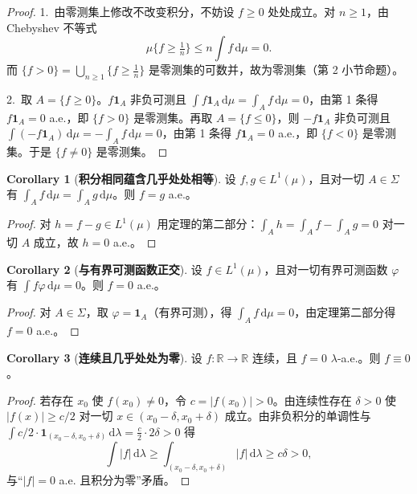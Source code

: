 \documentclass[oneside]{book}
\theoremstyle{definition}
\newcommand{\R}{\mathbb{R}}
\newcommand{\dd}{\mathrm{d}}
\theoremstyle{definition}
\newtheorem{corollary}{Corollary}[section]
\begin{document}
	\begin{proof}
		1.\ 由零测集上修改不改变积分，不妨设 $f\geqslant0$ 处处成立。对 $n\geqslant1$，由 Chebyshev 不等式
		\[
		\mu\{f\geqslant\tfrac1n\}\leqslant n\int f\,\dd\mu=0 .
		\]
		而 $\{f>0\}=\bigcup_{n\geqslant1}\{f\geqslant\tfrac1n\}$ 是零测集的可数并，故为零测集（第 2 小节命题）。
		
		2.\ 取 $A=\{f\geqslant0\}$。$f\mathbf{1}_A$ 非负可测且 $\int f\mathbf{1}_A\,\dd\mu=\int_A f\,\dd\mu=0$，由第 1 条得 $f\mathbf{1}_A=0$ a.e.，即 $\{f>0\}$ 是零测集。再取 $A=\{f\leqslant0\}$，则 $-f\mathbf{1}_A$ 非负可测且 $\int(-f\mathbf{1}_A)\,\dd\mu=-\int_A f\,\dd\mu=0$，由第 1 条得 $f\mathbf{1}_A=0$ a.e.，即 $\{f<0\}$ 是零测集。于是 $\{f\neq0\}$ 是零测集。
	\end{proof}
	
	\begin{corollary}[\bfseries{积分相同蕴含几乎处处相等}]
		设 $f,g\in L^{1}(\mu)$，且对一切 $A\in\Sigma$ 有 $\int_A f\,\dd\mu=\int_A g\,\dd\mu$。则 $f=g$ a.e.。
	\end{corollary}
	
	\begin{proof}
		对 $h=f-g\in L^{1}(\mu)$ 用定理的第二部分：$\int_A h=\int_A f-\int_A g=0$ 对一切 $A$ 成立，故 $h=0$ a.e.。
	\end{proof}
	
	\begin{corollary}[\bfseries{与有界可测函数正交}]
		设 $f\in L^{1}(\mu)$，且对一切有界可测函数 $\varphi$ 有 $\int f\varphi\,\dd\mu=0$。则 $f=0$ a.e.。
	\end{corollary}
	
	\begin{proof}
		对 $A\in\Sigma$，取 $\varphi=\mathbf{1}_A$（有界可测），得 $\int_A f\,\dd\mu=0$，由定理第二部分得 $f=0$ a.e.。
	\end{proof}
	
	\begin{corollary}[\bfseries{连续且几乎处处为零}]
		设 $f:\R\to\R$ 连续，且 $f=0$ $\lambda$-a.e.。则 $f\equiv0$。
	\end{corollary}
	
	\begin{proof}
		若存在 $x_0$ 使 $f(x_0)\neq0$，令 $c=|f(x_0)|>0$。由连续性存在 $\delta>0$ 使 $|f(x)|\geqslant c/2$ 对一切 $x\in(x_0-\delta,x_0+\delta)$ 成立。由非负积分的单调性与 $\int c/2\cdot\mathbf{1}_{(x_0-\delta,x_0+\delta)}\,\dd\lambda=\frac c2\cdot2\delta>0$ 得
		\[
		\int|f|\,\dd\lambda\geqslant\int_{(x_0-\delta,x_0+\delta)}|f|\,\dd\lambda\geqslant c\delta>0 ,
		\]
		与“$|f|=0$ a.e. 且积分为零”矛盾。
	\end{proof}
	
\end{document}
